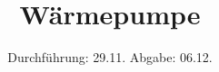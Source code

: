 
\usepackage{pgfplotstable}
\usepackage{caption}

\subject{V206}
\title{Wärmepumpe}
\date{%
  Durchführung: 29.11.
  \hspace{3em}
  Abgabe: 06.12.
}


\setlength{\parindent}{0pt} %

\maketitle
\thispagestyle{empty}
\tableofcontents
\newpage






\nocite{*}
\printbibliography{}


